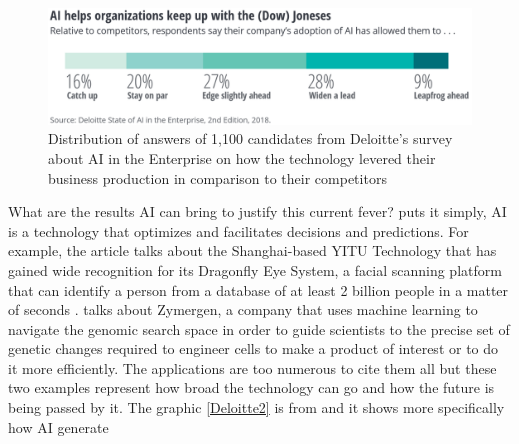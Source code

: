 \begin{figure}[h]
	\centering
	\includegraphics[width=1.0\textwidth]{Cap1/AI_Deloitte}
	\caption{Distribution of answers of  1,100 candidates from Deloitte's survey about AI in the Enterprise on how the technology levered their business production in comparison to their competitors}
	\label{Deloitte}
\end{figure}

What are the results AI can bring to justify this current fever? \cite{PredictionMachines2018} puts it simply, AI is a technology that optimizes and facilitates decisions and predictions. For example, the article \cite{FacialRec} talks about the Shanghai-based YITU Technology that  has gained wide recognition for its Dragonfly Eye System, a facial scanning platform that can identify a person from a database of at least 2 billion people in a matter of seconds .\cite{Zymergen} talks about  Zymergen, a company that uses machine learning to navigate the genomic search space in order to guide scientists to the precise set of genetic changes required to engineer cells to make a product of interest or to do it more efficiently. The applications are too numerous to cite them all but these two examples represent how broad the technology can go and how the future is being passed by it. The graphic \ref{Deloitte2} is from \cite{AiSurvey} and it shows more specifically how AI generate 

